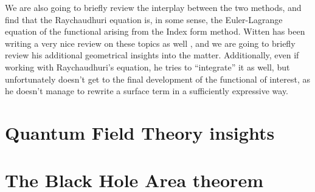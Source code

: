 We are also going to briefly review the interplay between the two methods, and find that the Raychaudhuri equation is, in some sense, the Euler-Lagrange equation of the functional arising from the Index form method. Witten has been writing a very nice review on these topics as well \cite[]{witten2020light}, and we are going to briefly review his additional geometrical insights into the matter. Additionally, even if working with Raychaudhuri's equation, he tries to ``integrate'' it as well, but unfortunately doesn't get to the final development of the functional of interest, as he doesn't manage to rewrite a surface term in a sufficiently expressive way.

\section{Quantum Field Theory insights}

\section{The Black Hole Area theorem}
